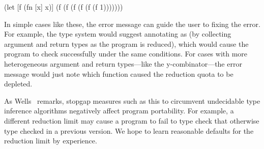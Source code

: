 \begin{cljlisting}
(let [f (fn [x] x)]
  (f (f (f (f (f (f 1)))))))
\end{cljlisting}

In simple cases like these, the error message 
can guide the user to fixing the error.
For example, the type system would suggest 
annotating  as  (by collecting
argument and return types as the program is reduced),
which would cause the program to check successfully
under the same conditions.
For cases with more heterogeneous argument and return types---like the y-combinator---the 
error message would just note which function caused
the reduction quota to be depleted.

As Wells~\cite{wells1994typability} remarks,
stopgap measures such as this to circumvent undecidable
type inference algorithms negatively affect
program portability.
For example, a different reduction limit may cause
a program to fail to type check that otherwise type checked
in a previous version.
We hope to learn reasonable defaults for the reduction limit
by experience.


%

